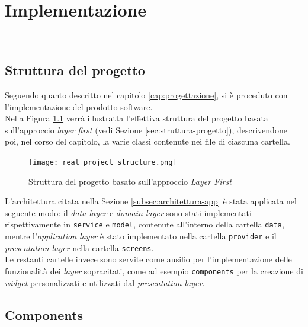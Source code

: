 \chapter{Implementazione}
\label{cap:implementazione}

\\

\section{Struttura del progetto}
\label{sec:struttura-progetto-impl}

Seguendo quanto descritto nel capitolo \ref{cap:progettazione}, si è proceduto con l'implementazione del prodotto software.\\
Nella Figura \ref{fig:real-project-structure} verrà illustratta l'effettiva struttura del progetto basata sull'approccio \emph{layer first} (vedi Sezione \ref{sec:struttura-progetto}), descrivendone poi, nel corso del capitolo, la varie classi contenute nei file di ciascuna cartella. \\

\begin{figure}[!h] 
    \centering 
    \texttt{[image: real\_project\_structure.png]}
    \caption{Struttura del progetto basato sull'approccio \emph{Layer First}}
    \label{fig:real-project-structure}
\end{figure}

L'architettura citata nella Sezione \ref{subsec:architettura-app} è stata applicata nel seguente modo: il \emph{data layer} e \emph{domain layer} sono stati implementati rispettivamente in \lstinline{service} e \lstinline{model}, contenute all'interno della cartella \lstinline{data}, mentre l'\emph{application layer} è stato implementato nella cartella \lstinline{provider} e il \emph{presentation layer} nella cartella \lstinline{screens}.\\
Le restanti cartelle invece sono servite come ausilio per l'implementazione delle funzionalità dei \emph{layer} sopracitati, come ad esempio \lstinline{components} per la creazione di \emph{widget} personalizzati e utilizzati dal \emph{presentation layer}.

\section{Components}
\label{sec:components}

